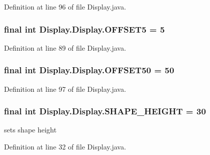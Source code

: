 Definition at line 96 of file Display.\+java.

\hypertarget{class_display_1_1_display_a265426fc52f9fc0f3cf08691bf8fc8bc}{}
\subsubsection[{O\+F\+F\+S\+E\+T5}]{\setlength{\rightskip}{0pt plus 5cm}final int Display.\+Display.\+O\+F\+F\+S\+E\+T5 = 5\hspace{0.3cm}{\ttfamily [static]}}\label{class_display_1_1_display_a265426fc52f9fc0f3cf08691bf8fc8bc}


Definition at line 89 of file Display.\+java.

\hypertarget{class_display_1_1_display_aab4544411ff6ce57f68415f53c73e2dc}{}
\subsubsection[{O\+F\+F\+S\+E\+T50}]{\setlength{\rightskip}{0pt plus 5cm}final int Display.\+Display.\+O\+F\+F\+S\+E\+T50 = 50\hspace{0.3cm}{\ttfamily [static]}}\label{class_display_1_1_display_aab4544411ff6ce57f68415f53c73e2dc}


Definition at line 97 of file Display.\+java.

\hypertarget{class_display_1_1_display_aeb8ee27fb9bb5ab9a43419faba0ff57e}{}
\subsubsection[{S\+H\+A\+P\+E\+\_\+\+H\+E\+I\+G\+H\+T}]{\setlength{\rightskip}{0pt plus 5cm}final int Display.\+Display.\+S\+H\+A\+P\+E\+\_\+\+H\+E\+I\+G\+H\+T = 30\hspace{0.3cm}{\ttfamily [private]}}\label{class_display_1_1_display_aeb8ee27fb9bb5ab9a43419faba0ff57e}
sets shape height 

Definition at line 32 of file Display.\+java.

